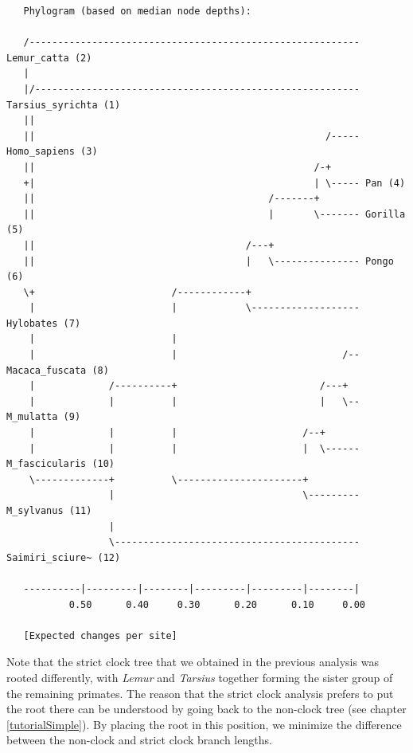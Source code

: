 \documentclass[12pt]{book}
\begin{document}
\scriptsize
\begin{singlespacing}
\begin{verbatim}
   Phylogram (based on median node depths):

   /---------------------------------------------------------- Lemur_catta (2)
   |                                                                               
   |/--------------------------------------------------------- Tarsius_syrichta (1)
   ||                                                                              
   ||                                                   /----- Homo_sapiens (3)
   ||                                                 /-+                          
   +|                                                 | \----- Pan (4)
   ||                                         /-------+                            
   ||                                         |       \------- Gorilla (5)
   ||                                     /---+                                    
   ||                                     |   \--------------- Pongo (6)
   \+                        /------------+                                        
    |                        |            \------------------- Hylobates (7)
    |                        |                                                     
    |                        |                             /-- Macaca_fuscata (8)
    |             /----------+                         /---+                       
    |             |          |                         |   \-- M_mulatta (9)
    |             |          |                      /--+                           
    |             |          |                      |  \------ M_fascicularis (10)
    \-------------+          \----------------------+                              
                  |                                 \--------- M_sylvanus (11)
                  |                                                                
                  \------------------------------------------- Saimiri_sciure~ (12)
                                                                                   
   ----------|---------|--------|---------|---------|--------|                     
           0.50      0.40     0.30      0.20      0.10     0.00 

   [Expected changes per site]
\end{verbatim}
\end{singlespacing}
\normalsize

Note that the strict clock tree that we obtained in the previous analysis was rooted differently,
with \textit{Lemur} and \textit{Tarsius} together forming the sister group of the remaining
primates. The reason that the strict clock analysis prefers to put the root there can be understood
by going back to the non-clock tree (see chapter \ref{tutorialSimple}). By placing the root in this
position, we minimize the difference between the non-clock and strict clock branch lengths.
\end{document}

